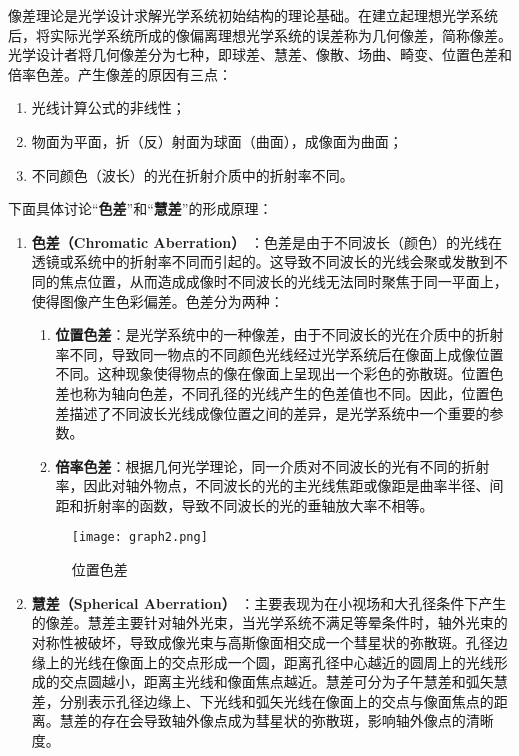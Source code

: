 \documentclass[dvipsnames, svgnames,a4paper,11pt]{article}
\begin{document}
像差理论是光学设计求解光学系统初始结构的理论基础。在建立起理想光学系统后，将实际光学系统所成的像偏离理想光学系统的误差称为几何像差，简称像差。光学设计者将几何像差分为七种，即球差、慧差、像散、场曲、畸变、位置色差和倍率色差。产生像差的原因有三点：
	\begin{enumerate}[label=\roman*.]
		\item 光线计算公式的非线性；
		\item 物面为平面，折（反）射面为球面（曲面），成像面为曲面；
		\item 不同颜色（波长）的光在折射介质中的折射率不同。
	\end{enumerate}
	
	下面具体讨论“\textbf{色差}”和“\textbf{慧差}”的形成原理：

	\begin{enumerate}
		\item \textbf{色差（Chromatic Aberration）} ：色差是由于不同波长（颜色）的光线在透镜或系统中的折射率不同而引起的。这导致不同波长的光线会聚或发散到不同的焦点位置，从而造成成像时不同波长的光线无法同时聚焦于同一平面上，使得图像产生色彩偏差。色差分为两种：
			\begin{enumerate}[label=\roman*.]
				\item \textbf{位置色差}：是光学系统中的一种像差，由于不同波长的光在介质中的折射率不同，导致同一物点的不同颜色光线经过光学系统后在像面上成像位置不同。这种现象使得物点的像在像面上呈现出一个彩色的弥散斑。位置色差也称为轴向色差，不同孔径的光线产生的色差值也不同。因此，位置色差描述了不同波长光线成像位置之间的差异，是光学系统中一个重要的参数。
				\item\textbf{倍率色差}：根据几何光学理论，同一介质对不同波长的光有不同的折射率，因此对轴外物点，不同波长的光的主光线焦距或像距是曲率半径、间距和折射率的函数，导致不同波长的光的垂轴放大率不相等。
			\end{enumerate}

			\begin{figure}[htbp]
				\centering
				\texttt{[image: graph2.png]}
				\caption{位置色差}
				\label{fig:graph2}
			\end{figure}
		
		\item \textbf{慧差（Spherical Aberration）} ：主要表现为在小视场和大孔径条件下产生的像差。慧差主要针对轴外光束，当光学系统不满足等晕条件时，轴外光束的对称性被破坏，导致成像光束与高斯像面相交成一个彗星状的弥散斑。孔径边缘上的光线在像面上的交点形成一个圆，距离孔径中心越近的圆周上的光线形成的交点圆越小，距离主光线和像面焦点越近。慧差可分为子午慧差和弧矢慧差，分别表示孔径边缘上、下光线和弧矢光线在像面上的交点与像面焦点的距离。慧差的存在会导致轴外像点成为彗星状的弥散斑，影响轴外像点的清晰度。
	\end{enumerate}
\end{document}

